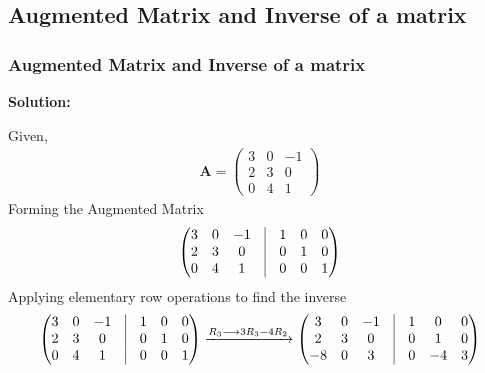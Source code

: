 \documentclass{beamer}
\theoremstyle{remark}
\newcommand{\myvec}[1]{\ensuremath{\begin{pmatrix}#1\end{pmatrix}}}
\let\vec\mathbf
\numberwithin{equation}{section}
\begin{document}
\subsection{ Augmented Matrix and Inverse of a matrix}
\begin{frame}
\frametitle{Augmented Matrix and Inverse of a matrix}
\textbf{Solution:}

Given, \begin{align} 
\vec{A}=\myvec{3&0&-1\\
       2&3&0\\
       0&4&1}
       \end{align}
Forming the Augmented Matrix
\begin{align}
\myvec{3&0&-1 &\vrule& 1&0&0 \\
       2&3&0 &\vrule&  0&1&0 \\
       0&4&1 &\vrule&  0&0&1 }
\end{align}
Applying elementary row operations to find the inverse
\begin{align}
\myvec{3&0&-1 &\vrule& 1&0&0 \\
       2&3&0 &\vrule&  0&1&0 \\
       0&4&1 &\vrule&  0&0&1 } \xrightarrow{R_3 \longrightarrow 3R_3-4R_2}
       \myvec{3&0&-1 &\vrule& 1&0&0 \\
       2&3&0 &\vrule&  0&1&0 \\
       -8&0&3 &\vrule&  0&-4&3} 
       \end{align}
       \end{frame}
\end{document}
